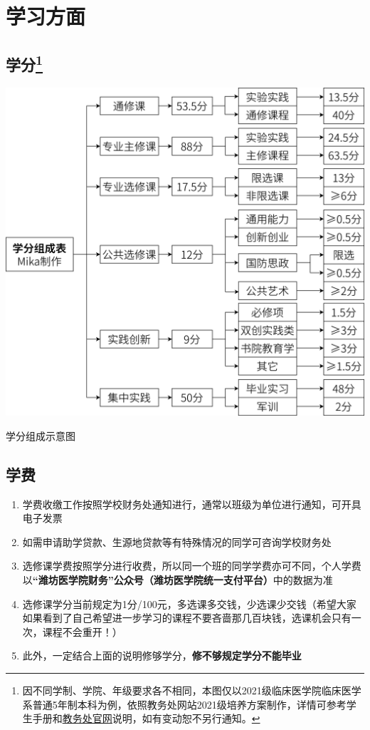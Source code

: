 \chapter[学习方面]{学习方面}
\section[学分]{学分\footnote{因不同学制、学院、年级要求各不相同，本图仅以2021级临床医学院临床医学系普通5年制本科为例，依照教务处网站2021级培养方案制作，详情可参考学生手册和\href{https://jwch.wfmc.edu.cn/2022/0916/c5343a107934/page.htm}{\uline{教务处官网}}说明，如有变动恕不另行通知。}\vspace{-1em}}
\begin{table}[ht]
    \centering
    \includegraphics[width=\textwidth]{学分.jpg}
    \vspace{-1em}
    \caption[学分组成示意图]{学分组成示意图}
    \label{score}
\end{table}

\section[学费]{学费}
\begin{enumerate}
    \item 学费收缴工作按照学校财务处通知进行，通常以班级为单位进行通知，可开具电子发票
    \item 如需申请助学贷款、生源地贷款等有特殊情况的同学可咨询学校财务处
    \item 选修课学费按照学分进行收费，所以同一个班的同学学费亦可不同，个人学费以\textbf{“潍坊医学院财务”公众号（潍坊医学院统一支付平台）}中的数据为准
    \item 选修课学分当前规定为1分/100元，多选课多交钱，少选课少交钱（希望大家如果看到了自己希望进一步学习的课程不要吝啬那几百块钱，选课机会只有一次，课程不会重开！）
    \item 此外，一定结合上面的说明修够学分，\textbf{修不够规定学分不能毕业}
\end{enumerate}

